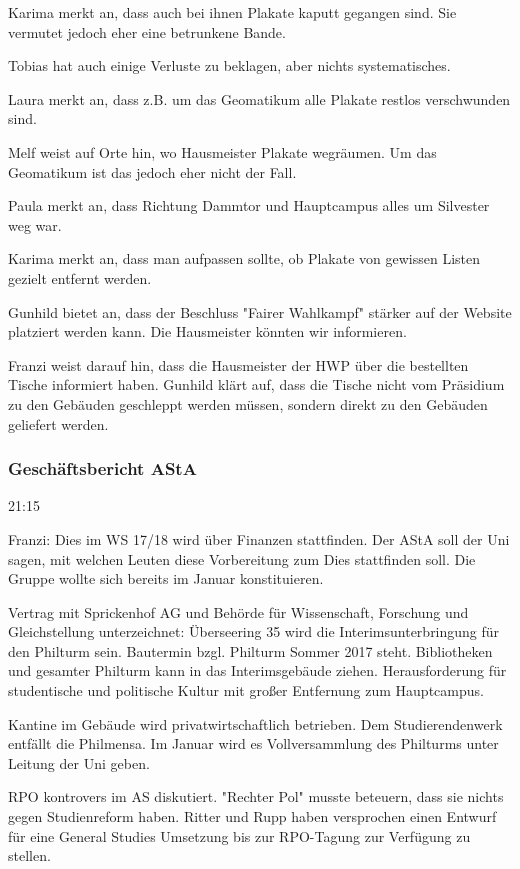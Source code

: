 \documentclass[ngerman,headheight=70pt]{scrartcl}
\begin{document}
    Karima merkt an, dass auch bei ihnen Plakate kaputt gegangen sind. Sie vermutet
    jedoch eher eine betrunkene Bande.

    Tobias hat auch einige Verluste zu beklagen, aber nichts systematisches.

    Laura merkt an, dass z.B. um das Geomatikum alle Plakate restlos verschwunden
    sind.

    Melf weist auf Orte hin, wo Hausmeister Plakate wegräumen. Um das Geomatikum
    ist das jedoch eher nicht der Fall.

    Paula merkt an, dass Richtung Dammtor und Hauptcampus alles um Silvester
    weg war.

    Karima merkt an, dass man aufpassen sollte, ob Plakate von gewissen Listen
    gezielt entfernt werden.

    Gunhild bietet an, dass der Beschluss "Fairer Wahlkampf" stärker auf der
    Website platziert werden kann. Die Hausmeister könnten wir informieren.

    Franzi weist darauf hin, dass die Hausmeister der HWP über die bestellten
    Tische informiert haben. Gunhild klärt auf, dass die Tische nicht vom
    Präsidium zu den Gebäuden geschleppt werden müssen, sondern direkt zu den
    Gebäuden geliefert werden.

    \subsubsection{Geschäftsbericht AStA}

    21:15

    Franzi:
    Dies im WS 17/18 wird über Finanzen stattfinden. Der AStA soll der Uni sagen,
    mit welchen Leuten diese Vorbereitung zum Dies stattfinden soll. Die Gruppe
    wollte sich bereits im Januar konstituieren.

    Vertrag mit Sprickenhof AG und Behörde für Wissenschaft, Forschung und
    Gleichstellung unterzeichnet:
    Überseering 35 wird die Interimsunterbringung für den Philturm sein. Bautermin
    bzgl. Philturm Sommer 2017 steht. Bibliotheken und gesamter Philturm kann
    in das Interimsgebäude ziehen. Herausforderung für studentische und politische
    Kultur mit großer Entfernung zum Hauptcampus.

    Kantine im Gebäude wird privatwirtschaftlich betrieben. Dem Studierendenwerk
    entfällt die Philmensa. Im Januar wird es Vollversammlung des Philturms
    unter Leitung der Uni geben.

    RPO kontrovers im AS diskutiert. "Rechter Pol" musste beteuern, dass sie
    nichts gegen Studienreform haben. Ritter und Rupp haben versprochen einen Entwurf
    für eine General Studies Umsetzung bis zur RPO-Tagung zur Verfügung zu stellen.
\end{document}
